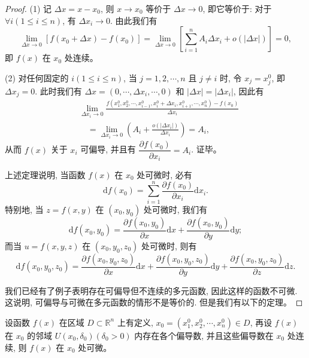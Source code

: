 \documentclass[12pt,fontset=fandol]{ctexart}
\begin{document}
\begin{proof}\quad (1) 记 $\Delta x=x-x_0$, 则 $x\to x_0$ 等价于 $\Delta x\to0$, 即它等价于: 对于 $\forall i(1\leqslant i\leqslant n)$, 有 $\Delta x_i\to0$. 由此我们有
\[
  \lim_{\Delta x\to0}[f(x_0+\Delta x)-f(x_0)]
  =
  \lim_{\Delta x\to0}\left[\sum_{i=1}^n A_i\Delta x_i+o(|\Delta x|)\right]=0,
\]
即 $f(x)$ 在 $x_0$ 处连续。

(2) 对任何固定的 $i(1\leqslant i\leqslant n)$, 当 $j=1,2,\cdots,n$ 且 $j\ne i$ 时, 令 $x_j=x_j^0$, 即 $\Delta x_j=0$. 此时我们有 $\Delta x=(0,\cdots,\Delta x_i,\cdots,0)$ 和 $|\Delta x|=|\Delta x_i|$, 因此有
\[
\begin{aligned}
&\lim_{\Delta x_i\to0}
  \frac{f(x_1^0,x_2^0,\cdots,x_{i-1}^0,x_i^0+\Delta x_i,x_{i+1}^0,\cdots,x_n^0)-f(x_0)}{\Delta x_i}\\
&\quad =
  \lim_{\Delta x_i\to0}\left(A_i+\frac{o(|\Delta x_i|)}{\Delta x_i}\right)=A_i,
\end{aligned}
\]
从而 $f(x)$ 关于 $x_i$ 可偏导, 并且有 $\dfrac{\partial f(x_0)}{\partial x_i}=A_i$. 证毕。

上述定理说明, 当函数 $f(x)$ 在 $x_0$ 处可微时, 必有
\[
  \mathrm df(x_0)=\sum_{i=1}^n\frac{\partial f(x_0)}{\partial x_i}\mathrm dx_i.
\]
特别地, 当 $z=f(x,y)$ 在 $(x_0,y_0)$ 处可微时, 我们有
\[
  \mathrm df(x_0,y_0)=\frac{\partial f(x_0,y_0)}{\partial x}\mathrm dx+
  \frac{\partial f(x_0,y_0)}{\partial y}\mathrm dy;
\]
而当 $u=f(x,y,z)$ 在 $(x_0,y_0,z_0)$ 处可微时, 则有
\[
  \mathrm df(x_0,y_0,z_0)=
  \frac{\partial f(x_0,y_0,z_0)}{\partial x}\mathrm dx+
  \frac{\partial f(x_0,y_0,z_0)}{\partial y}\mathrm dy+
  \frac{\partial f(x_0,y_0,z_0)}{\partial z}\mathrm dz.
\]

我们已经有了例子表明存在可偏导但不连续的多元函数, 因此这样的函数不可微. 这说明, 可偏导与可微在多元函数的情形不是等价的. 但是我们有以下的定理。

\end{proof}
\begin{theorem}\label{course-theorem-14-1-2}\quad 设函数 $f(x)$ 在区域 $D\subset\mathbb R^n$ 上有定义, $x_0=(x_1^0,x_2^0,\cdots,x_n^0)\in D$, 再设 $f(x)$ 在 $x_0$ 的邻域 $U(x_0,\delta_0)(\delta_0>0)$ 内存在各个偏导数, 并且这些偏导数在 $x_0$ 处连续, 则 $f(x)$ 在 $x_0$ 处可微。

\end{theorem}
\end{document}
